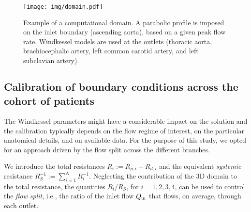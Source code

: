 \begin{figure}[!htp]
  \centering
  \texttt{[image: img/domain.pdf]}
  \caption{Example of a computational domain. A parabolic profile is imposed on the inlet boundary (ascending aorta), based on a given peak flow rate. 
  Windkessel models are used at the outlets (thoracic aorta, brachiocephalic artery, left common carotid artery, and left subclavian artery).}
  \label{fig:domain
}
  \label{fig:domain}
\end{figure}

\subsection{Calibration of boundary conditions across the cohort of patients}\label{ssec:bc-calibration}
The Windkessel parameters might have a considerable impact on the solution and the calibration typically depends on the flow regime of interest, on the
particular anatomical details, and on available data. For the purpose of this study, we opted for an approach driven by the flow split across
the different branches.

We introduce the total resistances
$R_i := R_{p,i} + R_{d,i}$ and the equivalent
\textit{systemic} resistance $R_S^{-1}  := \sum_{i=1}^N R_i^{-1}$. Neglecting the contribution of the 3D domain to the total resistance, the quantities
$R_i/ R_S$, for $i=1,2,3,4$, can be used to control the \textit{flow split}, i.e., the ratio of the inlet flow $Q_{\rm in}$ that flows, on average, through each outlet.

